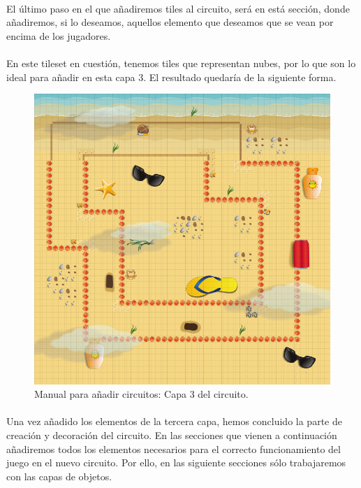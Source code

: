 \paragraph{}
El último paso en el que añadiremos tiles al circuito, será en está sección, donde añadiremos, si lo deseamos, aquellos elemento
que deseamos que se vean por encima de los jugadores.

\paragraph{}
En este tileset en cuestión, tenemos tiles que representan nubes, por lo que son lo ideal para añadir en esta capa 3. El resultado
quedaría de la siguiente forma.

\begin{figure}[H]
  \label{circuito_capa3}
  \begin{center}
    \includegraphics[scale=0.5]{imagenes/manualcircuito/circuito_capa3.png}
  \end{center}
  \caption{Manual para añadir circuitos: Capa 3 del circuito.}
\end{figure}

\paragraph{}
Una vez añadido los elementos de la tercera capa, hemos concluido la parte de creación y decoración del circuito. En las secciones
que vienen a continuación añadiremos todos los elementos necesarios para el correcto funcionamiento del juego en el nuevo circuito.
Por ello, en las siguiente secciones sólo trabajaremos con las capas de objetos.

